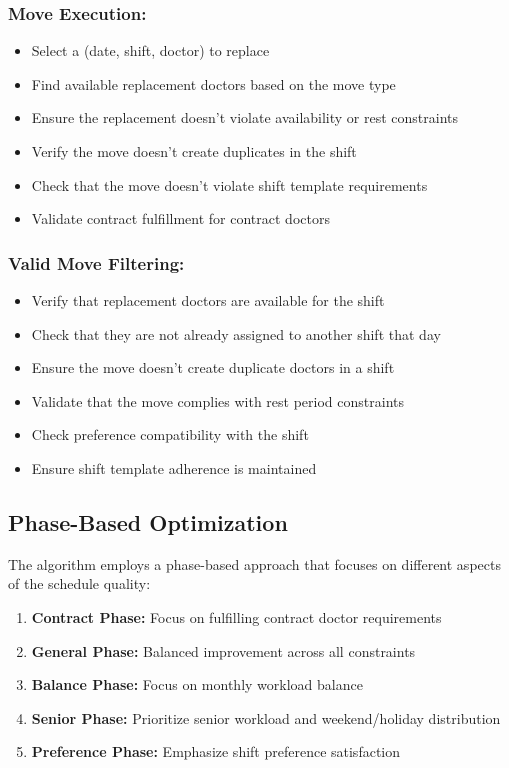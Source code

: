 \documentclass[12pt]{article}
\begin{document}
\subsubsection{Move Execution:}
\begin{itemize}
    \item Select a (date, shift, doctor) to replace
    \item Find available replacement doctors based on the move type
    \item Ensure the replacement doesn't violate availability or rest constraints
    \item Verify the move doesn't create duplicates in the shift
    \item Check that the move doesn't violate shift template requirements
    \item Validate contract fulfillment for contract doctors
\end{itemize}

\subsubsection{Valid Move Filtering:}
\begin{itemize}
    \item Verify that replacement doctors are available for the shift
    \item Check that they are not already assigned to another shift that day
    \item Ensure the move doesn't create duplicate doctors in a shift
    \item Validate that the move complies with rest period constraints
    \item Check preference compatibility with the shift
    \item Ensure shift template adherence is maintained
\end{itemize}

\subsection{Phase-Based Optimization}

The algorithm employs a phase-based approach that focuses on different aspects of the schedule quality:

\begin{enumerate}
    \item \textbf{Contract Phase:} Focus on fulfilling contract doctor requirements
    \item \textbf{General Phase:} Balanced improvement across all constraints
    \item \textbf{Balance Phase:} Focus on monthly workload balance
    \item \textbf{Senior Phase:} Prioritize senior workload and weekend/holiday distribution
    \item \textbf{Preference Phase:} Emphasize shift preference satisfaction
\end{enumerate}
\end{document}
